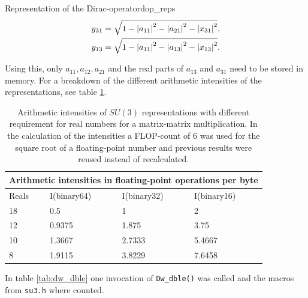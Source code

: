 \documentclass{article}
\theoremstyle{plain} %
\theoremstyle{convention} %
\theoremstyle{remark} %
\def\code#1{\texttt{#1}}
\numberwithin{equation}{section}
\begin{document}
\begin{proposal}{Representation of the Dirac-operator}{dop_reps}
\begin{align}
  y_{31} &= \sqrt{1 - \abs{a_{11}}^2 - \abs{a_{21}}^2 - \abs{x_{31}}^2}, \\
  y_{13} &= \sqrt{1 - \abs{a_{11}}^2 - \abs{a_{13}}^2 - \abs{x_{13}}^2}.
\end{align}

Using this, only $a_{11}, a_{12}, a_{21}$ and the real parts of $a_{13}$ and $a_{31}$ need to be stored in memory. For a breakdown of the different arithmetic intensities of the representations, see table \ref{tab:ai_su3}.

\begin{table}[H]
\centering
    \begin{tabular}{ |p{1.2cm}|p{2cm}|p{2cm}|p{2cm}|  }
        \hline
        \multicolumn{4}{|c|}{Arithmetic intensities in floating-point operations per byte} \\
        \hline
        Reals & I(binary64) & I(binary32) & I(binary16) \\
        \hline
        18  & 0.5    & 1       & 2      \\
        12  & 0.9375 & 1.875   & 3.75   \\
        10  & 1.3667 & 2.7333  & 5.4667 \\
        8   & 1.9115 & 3.8229  & 7.6458 \\
        \hline
    \end{tabular}
    \caption{Arithmetic intensities of $SU(3)$ representations with different requirement for real numbers for a matrix-matrix multiplication. In the calculation of the intensities a FLOP-count of \num{6} was used for the square root of a floating-point number and previous results were reused instead of recalculated.}
    \label{tab:ai_su3}
\end{table}
    
In table \ref{tab:dw_dble} one invocation of \code{Dw\_dble()} was called and the macros from \code{su3.h} where counted.


\end{proposal}
\end{document}

